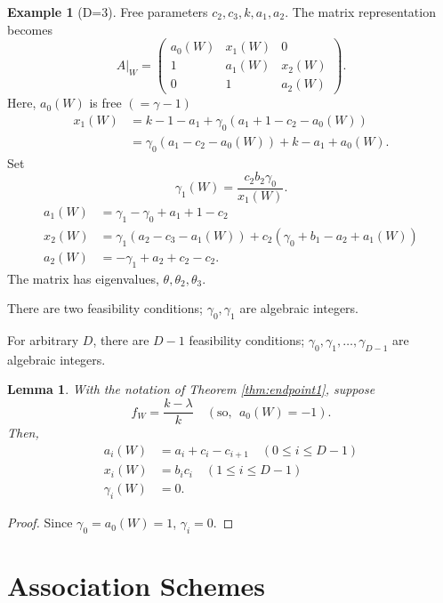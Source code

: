 \documentclass[
]{book}
\newtheorem{lemma}{Lemma}[chapter]
\theoremstyle{definition}
\theoremstyle{definition}
\newtheorem{example}{Example}[chapter]
\theoremstyle{definition}
\theoremstyle{definition}
\theoremstyle{remark}
\begin{document}
\begin{example}[D=3]
Free parameters \(c_2, c_3, k, a_1, a_2\). The matrix representation becomes
\[
A|_{W} = \begin{pmatrix} a_0(W) & x_1(W) & 0 \\ 1 & a_1(W) & x_2(W)\\ 0 & 1 & a_2(W) \end{pmatrix}.\]
Here, \(a_0(W)\) is free \((=\gamma - 1)\)
\begin{align}
x_1(W) & = k - 1 - a_1 + \gamma_0(a_1 + 1 - c_2 - a_0(W))\\
& = \gamma_0(a_1 - c_2 - a_0(W)) + k - a_1 + a_0(W).
\end{align}
Set
\[\gamma_1(W) = \frac{c_2b_2\gamma_0}{x_1(W)}.\]
\begin{align}
a_1(W) & = \gamma_1 - \gamma_0 + a_1 + 1 - c_2\\
x_2(W) & = \gamma_1(a_2 - c_3 - a_1(W)) + c_2(\gamma_0 + b_1 - a_2 + a_1(W))\\
a_2(W) & = -\gamma_1 + a_2 + c_2 - c_2.
\end{align}
The matrix has eigenvalues, \(\theta, \theta_2, \theta_3\).

There are two feasibility conditions; \(\gamma_0, \gamma_1\) are algebraic integers.

For arbitrary \(D\), there are \(D-1\) feasibility conditions;
\(\gamma_0, \gamma_1, \ldots, \gamma_{D-1}\) are algebraic integers.
\end{example}

\begin{lemma}
\protect\hypertarget{lem:aixigi}{}\label{lem:aixigi}With the notation of Theorem \ref{thm:endpoint1}, suppose
\[f_W = \frac{k-\lambda}{k} \quad (\text{so, }\; a_0(W) = -1).\]
Then,
\begin{align}
a_i(W) & = a_i + c_i - c_{i+1} \quad (0\leq i\leq D-1)\\
x_i(W) & = b_ic_i \quad (1\leq i\leq D-1)\\
\gamma_i(W) & = 0.
\end{align}
\end{lemma}

\begin{proof}
Since \(\gamma_0 = a_0(W) = 1\), \(\gamma_i = 0\).
\end{proof}

\hypertarget{lec17}{%
\chapter{Association Schemes}\label{lec17}}
\end{document}
